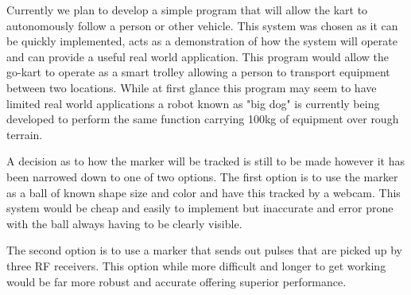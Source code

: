 Currently we plan to develop a simple program that will allow the kart to autonomously follow a person or other vehicle. This system was chosen as it can be quickly implemented, acts as a demonstration of how the system will operate and can provide a useful real world application. This program would allow the go-kart to operate as a smart trolley allowing a person to transport equipment between two locations. While at first glance this program may seem to have limited real world applications a robot known as "big dog" is currently being developed to perform the same function carrying 100kg of equipment over rough terrain\cite{bigdog}.

A decision as to how the marker will be tracked is still to be made however it has been narrowed down to one of two options. The first option is to use the marker as a ball of known shape size and color and have this tracked by a webcam. This system would be cheap and easily to implement but inaccurate and error prone with the ball always having to be clearly visible.

The second option is to use a marker that sends out pulses that are picked up by three RF receivers. This option while more difficult and longer to get working would be far more robust and accurate offering superior performance.


